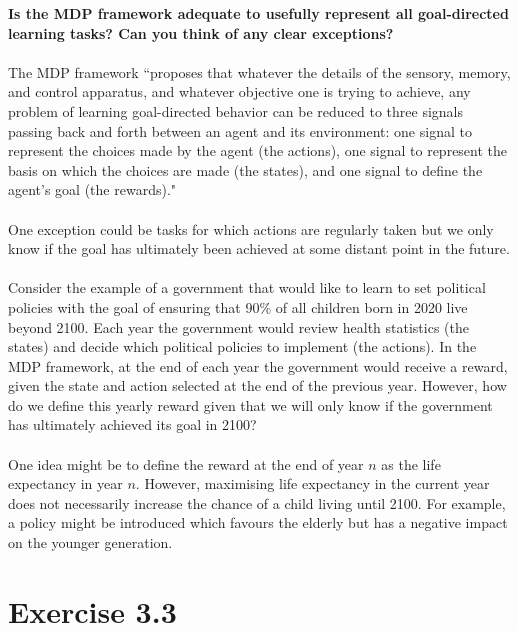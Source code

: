 \documentclass[a4paper,11pt]{article}
\numberwithin{equation}{section}
\theoremstyle{remark}
\begin{document}
\textbf{Is the MDP framework adequate to usefully represent all goal-directed learning tasks? Can you think of any clear exceptions?}
\\ \\
The MDP framework ``proposes that whatever the details of the sensory, memory, and control apparatus, and whatever objective one is trying to achieve, any problem of learning goal-directed behavior can be reduced to three signals passing back and forth between an agent and its environment: one signal to represent the choices made by the agent (the actions), one signal to represent the basis on which the choices are made (the states), and one signal to define the agent’s goal (the rewards)."
\\ \\
One exception could be tasks for which actions are regularly taken but we only know if the goal has ultimately been achieved at some distant point in the future. 
\\ \\
Consider the example of a government that would like to learn to set political policies with the goal of ensuring that 90\% of all children born in 2020 live beyond 2100. Each year the government would review health statistics (the states) and decide which political policies to implement (the actions). In the MDP framework, at the end of each year the government would receive a reward, given the state and action selected at the end of the previous year. However, how do we define this yearly reward given that we will only know if the government has ultimately achieved its goal in 2100? 
\\ \\
One idea might be to define the reward at the end of year $n$ as the life expectancy in year $n$. However, maximising life expectancy in the current year does not necessarily increase the chance of a child living until 2100. For example, a policy might be introduced which favours the elderly but has a negative impact on the younger generation. 



\section{Exercise 3.3}
\end{document}
